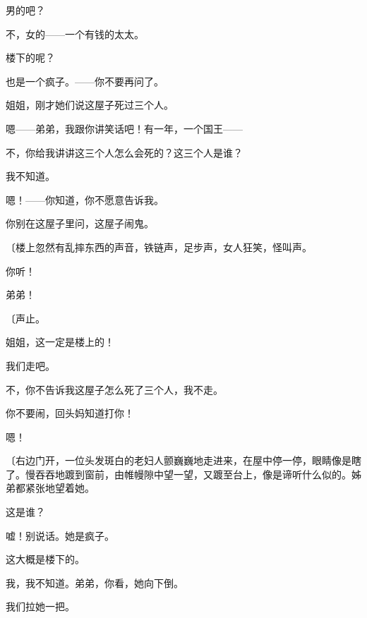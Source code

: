 男的吧？

不，女的——一个有钱的太太。

楼下的呢？

也是一个疯子。——你不要再问了。

姐姐，刚才她们说这屋子死过三个人。

嗯——弟弟，我跟你讲笑话吧！有一年，一个国王——

不，你给我讲讲这三个人怎么会死的？这三个人是谁？

我不知道。

嗯！——你知道，你不愿意告诉我。

你别在这屋子里问，这屋子闹鬼。

{\fangsong〔楼上忽然有乱摔东西的声音，铁链声，足步声，女人狂笑，怪叫声。}

你听！

弟弟！

{\fangsong〔声止。}

姐姐，这一定是楼上的！

我们走吧。

不，你不告诉我这屋子怎么死了三个人，我不走。

你不要闹，回头妈知道打你！

嗯！

{\fangsong〔右边门开，一位头发斑白的老妇人颤巍巍地走进来，在屋中停一停，眼睛像是瞎了。慢吞吞地踱到窗前，由帷幔隙中望一望，又踱至台上，像是谛听什么似的。姊弟都紧张地望着她。}

这是谁？

嘘！别说话。她是疯子。

这大概是楼下的。

我，我不知道。弟弟，你看，她向下倒。

我们拉她一把。

